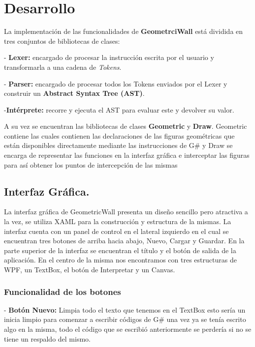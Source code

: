 \documentclass[a4paper,12pt]{article}
\begin{document}
	
	\newpage
	
	
	\section{Desarrollo}\label{sec:desarrollo}
	
	La implementación de las funcionalidades de \textbf{GeometrciWall} está dividida en tres conjuntos de bibliotecas de clases:
	
	- \textbf{Lexer:} encargado de procesar la instrucción escrita por el usuario y transformarla a una cadena de \emph{Tokens}.
	
	- \textbf{Parser:} encargado de procesar todos los Tokens enviados por el Lexer y construir un \textbf{Abstract Syntax Tree (AST)}.
	
	-\textbf{Intérprete:} recorre y ejecuta el AST para evaluar este y devolver su valor.
	
	A su vez se encuentran las bibliotecas de clases \textbf{Geometric} y \textbf{Draw}. Geometric contiene las cuales contienen las declaraciones de las figuras geométricas que están disponibles directamente mediante las instrucciones de G\# y Draw se encarga de representar las funciones en la interfaz gráfica e interceptar las figuras para así obtener los puntos de intercepción de las mismas
	
	
	\subsection{Interfaz Gráfica.}\label{sub:interfaz gráfica}
	La interfaz gráfica de GeometricWall presenta un diseño sencillo pero atractiva a la vez, se utiliza XAML para la construcción y estructura de la mismas. La interfaz cuenta con un panel de control en el lateral izquierdo en el cual se encuentran tres botones de arriba hacia abajo, Nuevo, Cargar y Guardar. En la parte superior de la interfaz se encuentran el título y el botón de salida de la aplicación. En el centro de la misma nos encontramos con tres estructuras de WPF, un TextBox, el botón de Interpretar y un Canvas.
	
	\subsubsection{Funcionalidad de los botones}\label{subsub:funcionalidad de los botones}
	
	- \textbf{Botón Nuevo:} Limpia todo el texto que tenemos en el TextBox esto sería un inicia limpio para comenzar a escribir códigos de G\# una vez ya se tenía escrito algo en la misma, todo el código que se escribió anteriormente se perdería si no se tiene un respaldo del mismo.
	
\end{document}
